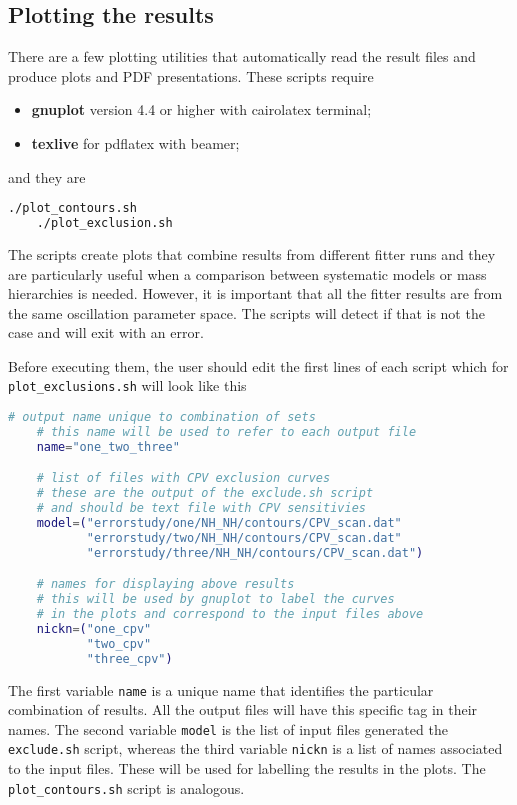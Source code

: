 \documentclass[a4paper, 11pt]{article}
\begin{document}
\subsection{Plotting the results}
\label{sec:plot}

There are a few plotting utilities that automatically read the result files %
and produce plots and PDF presentations.
These scripts require
\begin{itemize}
		\small
	\item \textbf{gnuplot} version 4.4 or higher with cairolatex terminal;
	\item \textbf{texlive} for pdflatex with beamer;
\end{itemize}
and they are
\begin{lstlisting}[language=bash]
	./plot_contours.sh
	./plot_exclusion.sh
\end{lstlisting}
The scripts create plots that combine results from different fitter runs and they are particularly useful %
when a comparison between systematic models or mass hierarchies is needed.
However, it is important that all the fitter results are from the same oscillation parameter space.
The scripts will detect if that is not the case and will exit with an error.

Before executing them, the user should edit the first lines of each script which for %
\texttt{plot\_exclusions.sh} will look like this %

\begin{lstlisting}[language=bash]
	# output name unique to combination of sets
	# this name will be used to refer to each output file
	name="one_two_three"

	# list of files with CPV exclusion curves
	# these are the output of the exclude.sh script
	# and should be text file with CPV sensitivies
	model=("errorstudy/one/NH_NH/contours/CPV_scan.dat"
	       "errorstudy/two/NH_NH/contours/CPV_scan.dat"
	       "errorstudy/three/NH_NH/contours/CPV_scan.dat")

	# names for displaying above results
	# this will be used by gnuplot to label the curves
	# in the plots and correspond to the input files above
	nickn=("one_cpv"
	       "two_cpv"
	       "three_cpv")
\end{lstlisting}
The first variable \texttt{name} is a unique name that identifies the particular combination of results.
All the output files will have this specific tag in their names.
The second variable \texttt{model} is the list of input files generated the \texttt{exclude.sh} script, %
whereas the third variable \texttt{nickn} is a list of names associated to the input files.
These will be used for labelling the results in the plots.
The \texttt{plot\_contours.sh} script is analogous.
\end{document}
